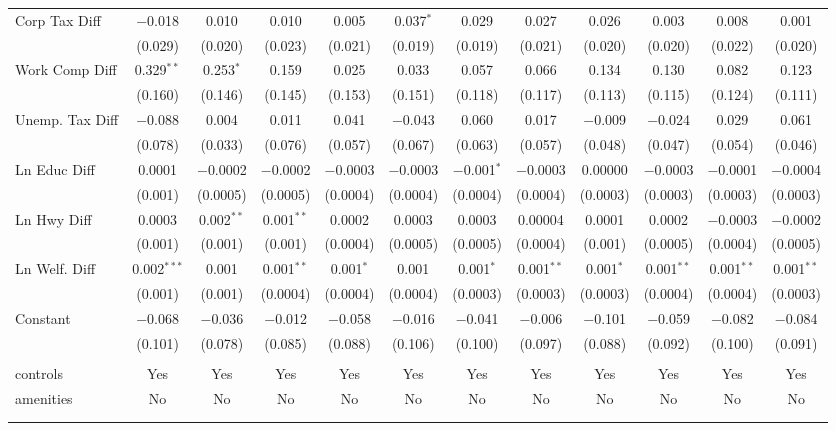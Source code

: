 \begin{table}[!htbp]
\begin{tabular}{@{\extracolsep{5pt}}lccccccccccc}
  Corp Tax Diff & $-$0.018 & 0.010 & 0.010 & 0.005 & 0.037$^{*}$ & 0.029 & 0.027 & 0.026 & 0.003 & 0.008 & 0.001 \\ 
  & (0.029) & (0.020) & (0.023) & (0.021) & (0.019) & (0.019) & (0.021) & (0.020) & (0.020) & (0.022) & (0.020) \\ 
  Work Comp Diff & 0.329$^{**}$ & 0.253$^{*}$ & 0.159 & 0.025 & 0.033 & 0.057 & 0.066 & 0.134 & 0.130 & 0.082 & 0.123 \\ 
  & (0.160) & (0.146) & (0.145) & (0.153) & (0.151) & (0.118) & (0.117) & (0.113) & (0.115) & (0.124) & (0.111) \\ 
  Unemp. Tax Diff & $-$0.088 & 0.004 & 0.011 & 0.041 & $-$0.043 & 0.060 & 0.017 & $-$0.009 & $-$0.024 & 0.029 & 0.061 \\ 
  & (0.078) & (0.033) & (0.076) & (0.057) & (0.067) & (0.063) & (0.057) & (0.048) & (0.047) & (0.054) & (0.046) \\ 
  Ln Educ Diff & 0.0001 & $-$0.0002 & $-$0.0002 & $-$0.0003 & $-$0.0003 & $-$0.001$^{*}$ & $-$0.0003 & 0.00000 & $-$0.0003 & $-$0.0001 & $-$0.0004 \\ 
  & (0.001) & (0.0005) & (0.0005) & (0.0004) & (0.0004) & (0.0004) & (0.0004) & (0.0003) & (0.0003) & (0.0003) & (0.0003) \\ 
  Ln Hwy Diff & 0.0003 & 0.002$^{**}$ & 0.001$^{**}$ & 0.0002 & 0.0003 & 0.0003 & 0.00004 & 0.0001 & 0.0002 & $-$0.0003 & $-$0.0002 \\ 
  & (0.001) & (0.001) & (0.001) & (0.0004) & (0.0005) & (0.0005) & (0.0004) & (0.001) & (0.0005) & (0.0004) & (0.0005) \\ 
  Ln Welf. Diff & 0.002$^{***}$ & 0.001 & 0.001$^{**}$ & 0.001$^{*}$ & 0.001 & 0.001$^{*}$ & 0.001$^{**}$ & 0.001$^{*}$ & 0.001$^{**}$ & 0.001$^{**}$ & 0.001$^{**}$ \\ 
  & (0.001) & (0.001) & (0.0004) & (0.0004) & (0.0004) & (0.0003) & (0.0003) & (0.0003) & (0.0004) & (0.0004) & (0.0003) \\ 
  Constant & $-$0.068 & $-$0.036 & $-$0.012 & $-$0.058 & $-$0.016 & $-$0.041 & $-$0.006 & $-$0.101 & $-$0.059 & $-$0.082 & $-$0.084 \\ 
  & (0.101) & (0.078) & (0.085) & (0.088) & (0.106) & (0.100) & (0.097) & (0.088) & (0.092) & (0.100) & (0.091) \\ 
 \hline \\[-1.8ex] 
controls & Yes & Yes & Yes & Yes & Yes & Yes & Yes & Yes & Yes & Yes & Yes \\ 
amenities & No & No & No & No & No & No & No & No & No & No & No \\ 
\hline \\[-1.8ex] 
\hline 
\hline \\[-1.8ex] 
\end{tabular} 
\end{table} 
